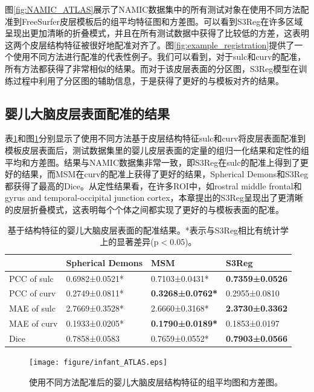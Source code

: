 图\ref{fig:NAMIC_ATLAS}展示了NAMIC数据集中的所有测试对象在使用不同方法配准到FreeSurfer皮层模板后的组平均特征图和方差图。可以看到S3Reg在许多区域呈现出更加清晰的折叠模式，并且在所有测试数据中获得了比较低的方差，这表明这两个皮层结构特征被很好地配准对齐了。图\ref{fig:example_registration}提供了一个使用不同方法进行配准的代表性例子。我们可以看到，对于sulc和curv的配准，所有方法都获得了非常相似的结果。而对于该皮层表面的分区图，S3Reg模型在训练过程中利用了分区图的辅助信息，于是获得了更好的与模板对齐的结果。

\subsection{婴儿大脑皮层表面配准的结果}
表\ref{tab:婴儿皮层表面的配准结果}和图\ref{fig:infant_ATLAS}分别显示了使用不同方法基于皮层结构特征sulc和curv将皮层表面配准到模板皮层表面后，测试数据集里的婴儿皮层表面的定量的组归一化结果和定性的组平均和方差图。结果与NAMIC数据集非常一致，即S3Reg在sulc的配准上得到了更好的结果，而MSM在curv的配准上获得了更好的结果，Spherical Demons和S3Reg都获得了最高的Dice。从定性结果看，在许多ROI中，如rostral middle frontal和gyrus and temporal-occipital junction cortex，本章提出的S3Reg呈现出了更清晰的皮层折叠模式，这表明每个个体之间都实现了更好的与模板表面的配准。

\begin{table}[t]
	\caption{基于结构特征的婴儿大脑皮层表面的配准结果。*表示与S3Reg相比有统计学上的显著差异(p$<$0.05)。}
	\label{tab:婴儿皮层表面的配准结果}
	\centering
	\begin{tabularx}{0.9\columnwidth}{X<{\centering}|X<{\centering}|X<{\centering}|X<{\centering}}
		\hline
			& Spherical Demons &	MSM	& S3Reg  \\
		\hline
			PCC of sulc &	0.6982±0.0521* &	0.7103±0.0431*  &	\textbf{0.7359±0.0526}  \\
			PCC of curv &	0.2749±0.0811*	&  \textbf{0.3268±0.0762*}  &	0.2955±0.0810\\
			MAE of sulc &	2.7669±0.3528* &	2.6660±0.3168* &	\textbf{2.3730±0.3362}  \\
			MAE of curv &	0.1933±0.0205* &	\textbf{0.1790±0.0189*} &	0.1853±0.0197\\
			Dice&	0.7858±0.0583 &	0.7659±0.0552* &	\textbf{0.7903±0.0566} \\		
		\hline
	\end{tabularx}
\end{table}

\begin{figure}[h]
	\centering
	\texttt{[image: figure/infant\_ATLAS.eps]}
	\caption{使用不同方法配准后的婴儿大脑皮层结构特征的组平均图和方差图。}
	\label{fig:infant_ATLAS}
\end{figure}

